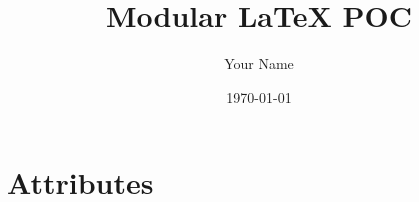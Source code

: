 \documentclass[12pt]{article}
\begin{document}
\ClearBackgroundImage
{}
\title{Modular LaTeX POC}
\author{Your Name}
\date{\today}
\maketitle
\ClearBackgroundImage
\newpage
\begin{multicols}{2}
\tableofcontents
\end{multicols}
\newpage
\section{Attributes}
        \newpage
\end{document}
